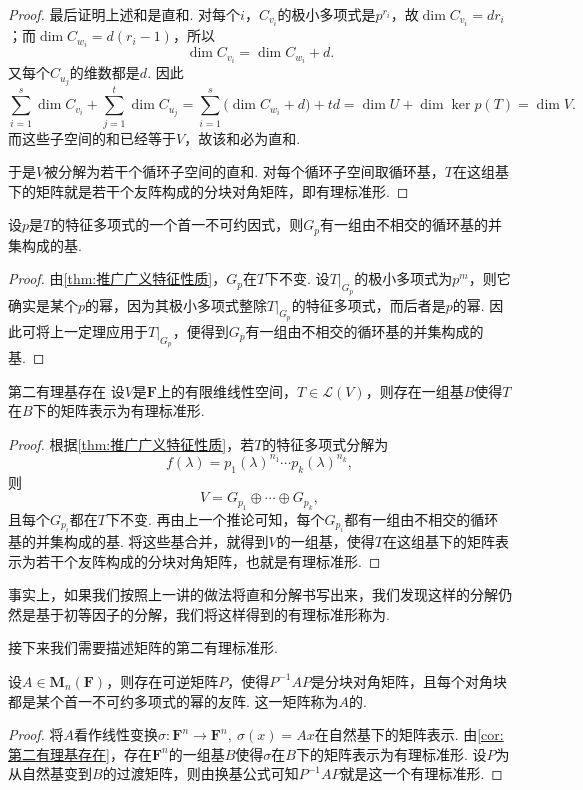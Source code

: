 \begin{proof}
    最后证明上述和是直和. 对每个$i$，$C_{v_i}$的极小多项式是$p^{r_i}$，故$\dim C_{v_i}=dr_i$；而$\dim C_{w_i}=d(r_i-1)$，所以
    \[
        \dim C_{v_i}=\dim C_{w_i}+d.
    \]
    又每个$C_{u_j}$的维数都是$d$. 因此
    \[
        \sum_{i=1}^s\dim C_{v_i}+\sum_{j=1}^t\dim C_{u_j}
        =\sum_{i=1}^s\bigl(\dim C_{w_i}+d\bigr)+td
        =\dim U+\dim\ker p(T)
        =\dim V.
    \]
    而这些子空间的和已经等于$V$，故该和必为直和.

    于是$V$被分解为若干个循环子空间的直和. 对每个循环子空间取循环基，$T$在这组基下的矩阵就是若干个友阵构成的分块对角矩阵，即有理标准形.
\end{proof}

\begin{corollary}{}{}
    设$p$是$T$的特征多项式的一个首一不可约因式，则$G_p$有一组由不相交的循环基的并集构成的基.
\end{corollary}
\begin{proof}
    由\autoref{thm:推广广义特征性质}，$G_p$在$T$下不变. 设$T\vert_{G_p}$的极小多项式为$p^m$，则它确实是某个$p$的幂，因为其极小多项式整除$T\vert_{G_p}$的特征多项式，而后者是$p$的幂. 因此可将上一定理应用于$T\vert_{G_p}$，便得到$G_p$有一组由不相交的循环基的并集构成的基.
\end{proof}

\begin{corollary}{}{第二有理基存在}
    设$V$是$\mathbf{F}$上的有限维线性空间，$T\in\mathcal{L}(V)$，则存在一组基$B$使得$T$在$B$下的矩阵表示为有理标准形.
\end{corollary}
\begin{proof}
    根据\autoref{thm:推广广义特征性质}，若$T$的特征多项式分解为
    \[
        f(\lambda)=p_1(\lambda)^{n_1}\cdots p_k(\lambda)^{n_k},
    \]
    则
    \[
        V=G_{p_1}\oplus\cdots\oplus G_{p_k},
    \]
    且每个$G_{p_i}$都在$T$下不变. 再由上一个推论可知，每个$G_{p_i}$都有一组由不相交的循环基的并集构成的基. 将这些基合并，就得到$V$的一组基，使得$T$在这组基下的矩阵表示为若干个友阵构成的分块对角矩阵，也就是有理标准形.
\end{proof}
事实上，如果我们按照上一讲的做法将直和分解书写出来，我们发现这样的分解仍然是基于初等因子的分解，我们将这样得到的有理标准形称为.

接下来我们需要描述矩阵的第二有理标准形.
\begin{corollary}{}{}
    设$A\in\mathbf{M}_n(\mathbf{F})$，则存在可逆矩阵$P$，使得$P^{-1}AP$是分块对角矩阵，且每个对角块都是某个首一不可约多项式的幂的友阵. 这一矩阵称为$A$的.
\end{corollary}
\begin{proof}
    将$A$看作线性变换$\sigma:\mathbf{F}^n\to\mathbf{F}^n,\ \sigma(x)=Ax$在自然基下的矩阵表示. 由\autoref{cor:第二有理基存在}，存在$\mathbf{F}^n$的一组基$B$使得$\sigma$在$B$下的矩阵表示为有理标准形. 设$P$为从自然基变到$B$的过渡矩阵，则由换基公式可知$P^{-1}AP$就是这一个有理标准形.
\end{proof}

